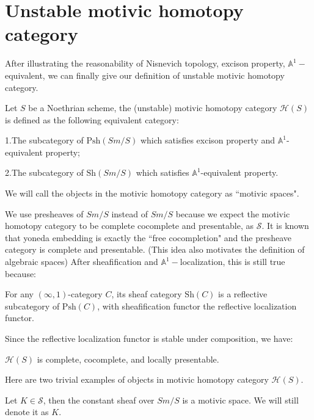 \section{Unstable motivic homotopy category}

After illustrating the reasonability of Nisnevich topology, excison property, $\mathbb{A}^1-$equivalent, we can finally give our definition of unstable motivic homotopy category.

\begin{definition}
    Let $S$ be a Noethrian scheme, the (unstable) motivic homotopy category $\mathcal{H}(S)$ is defined as the following equivalent category:
    
    1.The subcategory of $\text{Psh}(Sm/S)$ which satisfies excison property and $\mathbb{A}^1$-equivalent property;

    2.The subcategory of $\text{Sh}(Sm/S)$ which satisfies $\mathbb{A}^1$-equivalent property.


    We will call the objects in the motivic homotopy category as ``motivic spaces".

\end{definition}

We use presheaves of $Sm/S$ instead of $Sm/S$ because we expect the motivic homotopy category to be complete cocomplete and presentable, as $\mathscr{S}$. It is known that yoneda embedding is exactly the ``free cocompletion" and the presheave category is complete and presentable. (This idea also motivates the definition of algebraic spaces) After sheafification and $\mathbb{A}^1-$localization, this is still true because:

\begin{lemma}
    For any $(\infty,1)$-category $C$, its sheaf category $\text{Sh}(C)$ is a reflective subcategory of $\text{Psh}(C)$, with sheafification functor the reflective localization functor.
\end{lemma}

Since the reflective localization functor is stable under composition, we have:

\begin{proposition}
    $\mathcal{H}(S)$ is complete, cocomplete, and locally presentable.
\end{proposition}



Here are two trivial examples of objects in motivic homotopy category $\mathcal{H}(S)$.

\begin{example}
    Let $K\in \mathscr{S}$, then the constant sheaf over $Sm/S$ is a motivic space. We will still denote it as $K$.
\end{example}

